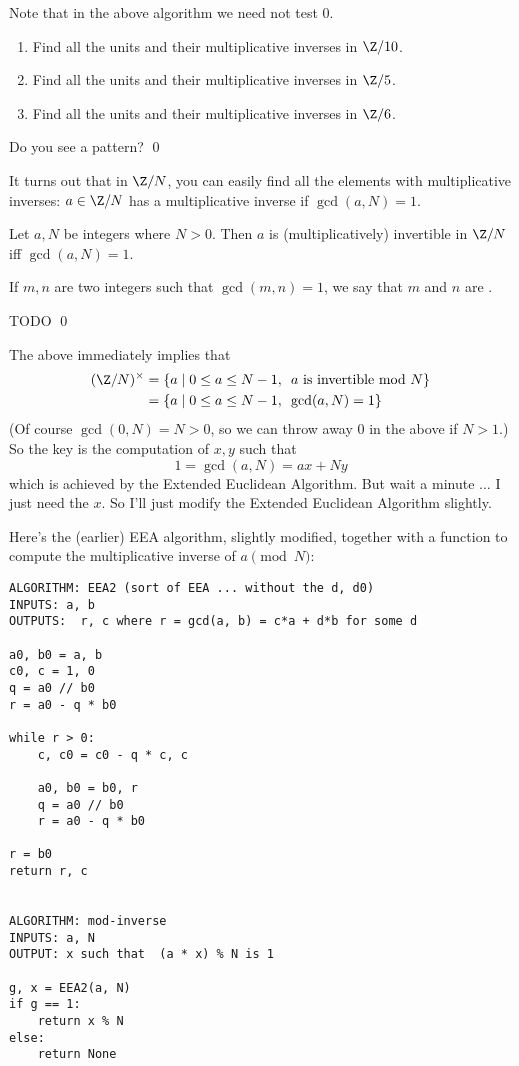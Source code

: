 Note that in the above algorithm we need not test $0$.

\begin{ex}
  \mbox{}
  \begin{enumerate}[nosep,label=\textnormal{(\alph*)}]
  \item Find all the units and their multiplicative inverses in $\Z/10$.
  \item Find all the units and their multiplicative inverses in $\Z/5$.
  \item Find all the units and their multiplicative inverses in $\Z/6$.
  \end{enumerate}
  Do you see a pattern?
  \qed
\end{ex}

It turns out that in $\Z/N$, you can easily find all the elements
with multiplicative inverses: $a \in \Z/N$ has a multiplicative
inverse if $\gcd(a, N) = 1$.

\begin{prop}
  Let $a, N$ be integers where $N > 0$. Then
  $a$ is (multiplicatively) invertible in $\Z/N$ iff $\gcd(a, N) = 1$.
\end{prop}

If $m,n$ are two integers such that $\gcd(m,n) = 1$, we say that
$m$ and $n$ are
.

\proof
TODO
\qed


The above immediately implies that
\begin{align*}
(\Z/N)^\times
&= \{ a \mid 0 \leq a \leq N - 1, \,\,\, \text{$a$ is invertible mod $N$} \}\\
&= \{ a \mid 0 \leq a \leq N - 1, \,\,\, \gcd(a, N) = 1 \}
\end{align*}
(Of course $\gcd(0, N) = N > 0$, so we can throw away $0$ in the above
if $N > 1$.)
So the key is the computation of $x,y$ such that
\[
1 = \gcd(a, N) = ax + Ny
\]
which is achieved by the Extended Euclidean Algorithm.
But wait a minute ... I just need the $x$.
So I'll just modify the Extended Euclidean Algorithm slightly.

Here's the (earlier) EEA algorithm, slightly modified,
together with a function to compute the multiplicative inverse of $a \pmod{N}$:
\begin{Verbatim}[frame=single, fontsize=\footnotesize]
ALGORITHM: EEA2 (sort of EEA ... without the d, d0)
INPUTS: a, b
OUTPUTS:  r, c where r = gcd(a, b) = c*a + d*b for some d

a0, b0 = a, b
c0, c = 1, 0
q = a0 // b0
r = a0 - q * b0

while r > 0:   
    c, c0 = c0 - q * c, c

    a0, b0 = b0, r
    q = a0 // b0
    r = a0 - q * b0

r = b0
return r, c


ALGORITHM: mod-inverse
INPUTS: a, N
OUTPUT: x such that  (a * x) % N is 1

g, x = EEA2(a, N)
if g == 1:
    return x % N
else:
    return None
\end{Verbatim}


